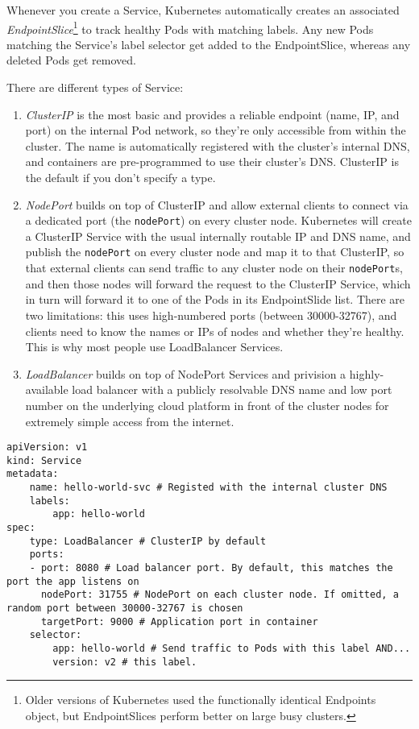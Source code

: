 \documentclass[8pt, table, xcdraw]{article}%
\begin{document}
Whenever you create a Service, Kubernetes automatically creates an associated \emph{EndpointSlice}\footnote{Older versions of Kubernetes used the functionally identical Endpoints object, but EndpointSlices perform better on large busy clusters.} to track healthy Pods with matching labels. Any new Pods matching the Service’s label selector get added to the EndpointSlice, whereas any deleted Pods get removed.

There are different types of Service:

\begin{enumerate}
    \item \emph{ClusterIP} is the most basic and provides a reliable endpoint (name, IP, and port) on the internal Pod network, so they're only accessible from within the cluster. The name is automatically registered with the cluster’s internal DNS, and containers are pre-programmed to use their cluster's DNS. ClusterIP is the default if you don't specify a type.
    \item \emph{NodePort} builds on top of ClusterIP and allow external clients to connect via a dedicated port (the \lstinline{nodePort}) on every cluster node. Kubernetes will create a ClusterIP Service with the usual internally routable IP and DNS name, and publish the \lstinline{nodePort} on every cluster node and map it to that ClusterIP, so that external clients can send traffic to any cluster node on their \lstinline{nodePort}s, and then those nodes will forward the request to the ClusterIP Service, which in turn will forward it to one of the Pods in its EndpointSlide list. There are two limitations: this uses high-numbered ports (between 30000-32767), and clients need to know the names or IPs of nodes and whether they're healthy. This is why most people use LoadBalancer Services.
    \item \emph{LoadBalancer} builds on top of NodePort Services and privision a highly-available load balancer with a publicly resolvable DNS name and low port number on the underlying cloud platform in front of the cluster nodes for extremely simple access from the internet.
\end{enumerate}

\begin{lstlisting}
apiVersion: v1
kind: Service
metadata:
    name: hello-world-svc # Registed with the internal cluster DNS
    labels:
        app: hello-world
spec:
    type: LoadBalancer # ClusterIP by default
    ports:
    - port: 8080 # Load balancer port. By default, this matches the port the app listens on
      nodePort: 31755 # NodePort on each cluster node. If omitted, a random port between 30000-32767 is chosen
      targetPort: 9000 # Application port in container
    selector:
        app: hello-world # Send traffic to Pods with this label AND...
        version: v2 # this label.
\end{lstlisting}
\end{document}
